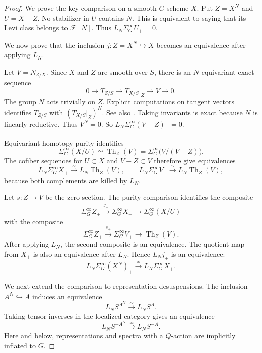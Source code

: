 \documentclass[11pt,reqno]{amsart}
\theoremstyle{definition}
\theoremstyle{remark}
\theoremstyle{plain}
\numberwithin{equation}{section}
\DeclareMathOperator{\Th}{Th}
\newcommand{\F}{\mathcal F}
\begin{document}
\begin{proof}
We prove the key comparison on a smooth \(G\)-scheme \(X\).
Put \(Z=X^N\) and \(U=X-Z\).
No stabilizer in \(U\) contains \(N\).
This is equivalent to saying that its Levi class belongs to
\(\F[N]\).
Thus \(L_N\Sigma^\infty_G U_+=0\).

We now prove that the inclusion \(j:Z=X^N\hookrightarrow X\)
becomes an equivalence after applying \(L_N\).

Let \(V=N_{Z/X}\). Since \(X\) and \(Z\) are smooth over \(S\),
there is an \(N\)-equivariant exact sequence
\[
 0\longrightarrow T_{Z/S}
 \longrightarrow T_{X/S}|_Z
 \longrightarrow V
 \longrightarrow 0.
\]
The group \(N\) acts trivially on \(Z\).
Explicit computations on tangent vectors identifies
\(T_{Z/S}\) with \((T_{X/S}|_Z)^N\). 
See also \cite[Theorem~13.1 and \S13.12]{MilneAG}.
Taking invariants is exact because \(N\) is linearly reductive.
Thus \(V^N=0\). So
\(L_N\Sigma^\infty_G(V-Z)_+=0\).

Equivariant homotopy purity
\cite[Theorem~3.23]{Hoyois} identifies
\[
 \Sigma^\infty_G(X/U)
 \simeq \Th_Z(V)
 =\Sigma^\infty_G\bigl(V/(V-Z)\bigr).
\]
The cofiber sequences for \(U\subset X\) and \(V-Z\subset V\)
therefore give equivalences
\[
 L_N\Sigma^\infty_G X_+
   \xrightarrow{\sim} L_N\Th_Z(V),
 \qquad
 L_N\Sigma^\infty_G V_+
   \xrightarrow{\sim} L_N\Th_Z(V),
\]
because both complements are killed by \(L_N\).

Let \(s:Z\to V\) be the zero section.
The purity comparison identifies the composite
\[
 \Sigma^\infty_G Z_+
 \xrightarrow{j_+}\Sigma^\infty_G X_+
 \longrightarrow\Sigma^\infty_G(X/U)
\]
with the composite
\[
 \Sigma^\infty_G Z_+
 \xrightarrow{s_+}\Sigma^\infty_G V_+
 \longrightarrow\Th_Z(V).
\]
After applying \(L_N\), the second composite is an equivalence.
The quotient map from \(X_+\) is also an equivalence after \(L_N\).
Hence \(L_Nj_+\) is an equivalence:
\begin{equation}\label{eq:normal-inclusion}
 L_N\Sigma^\infty_G(X^N)_+
   \xrightarrow{\ \simeq\ }L_N\Sigma^\infty_G X_+.
\end{equation}

We next extend the comparison to representation desuspensions.
The inclusion $A^N\hookrightarrow A$ induces an equivalence
\[
  L_NS^{A^N}\xrightarrow{\simeq}L_NS^A.
\]
Taking tensor inverses in the localized category gives an equivalence
\[
  L_NS^{-A^N}\xrightarrow{\simeq}L_NS^{-A}.
\]
Here and below, representations and spectra with a $Q$-action are
implicitly inflated to $G$.


\end{proof}
\end{document}
